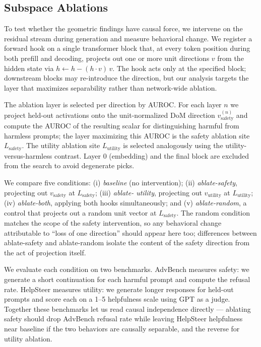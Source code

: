 \subsection{Subspace Ablations}
To test whether the geometric findings have causal force, we
intervene on the residual stream during generation and measure
behavioral change. We register a forward hook on a single
transformer block that, at every token position during both
prefill and decoding, projects out one or more unit directions $v$
from the hidden state via $h \leftarrow h - (h \cdot v)\, v$. The
hook acts only at the specified block; downstream blocks may
re-introduce the direction, but our analysis targets the layer
that maximizes separability rather than network-wide ablation.

The ablation layer is selected per direction by AUROC. For each
layer $n$ we project held-out activations onto the unit-normalized
DoM direction $v^{(n)}_{\text{safety}}$ and compute the AUROC of
the resulting scalar for distinguishing harmful from harmless
prompts; the layer maximizing this AUROC is the safety ablation
site $L_{\text{safety}}$. The utility ablation site
$L_{\text{utility}}$ is selected analogously using the
utility-versus-harmless contrast. Layer 0 (embedding) and the
final block are excluded from the search to avoid degenerate
picks.

We compare five conditions: (i) \emph{baseline} (no
intervention); (ii) \emph{ablate-safety}, projecting out
$v_{\text{safety}}$ at $L_{\text{safety}}$; (iii) \emph{ablate-
utility}, projecting out $v_{\text{utility}}$ at $L_{\text{utility}}$;
(iv) \emph{ablate-both}, applying both hooks simultaneously; and
(v) \emph{ablate-random}, a control that projects out a random
unit vector at $L_{\text{safety}}$. The random condition matches
the scope of the safety intervention, so any behavioral change
attributable to ``loss of one direction'' should appear here too;
differences between ablate-safety and ablate-random isolate the
content of the safety direction from the act of projection itself.

We evaluate each condition on two benchmarks. AdvBench measures
safety: we generate a short continuation for each harmful prompt
and compute the refusal rate. HelpSteer measures utility: we
generate longer responses for held-out prompts and score each on
a 1--5 helpfulness scale using GPT as a judge. Together these
benchmarks let us read causal independence directly --- ablating
safety should drop AdvBench refusal rate while leaving HelpSteer
helpfulness near baseline if the two behaviors are causally
separable, and the reverse for utility ablation.
